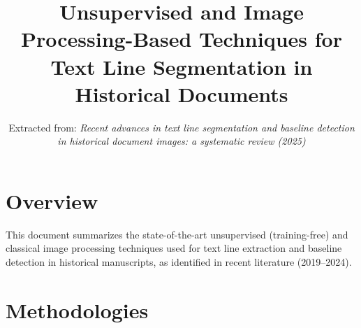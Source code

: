 \documentclass{article}
\title{Unsupervised and Image Processing-Based Techniques for \\ Text Line Segmentation in Historical Documents}
\author{Extracted from: \textit{Recent advances in text line segmentation and baseline detection} \\ \textit{in historical document images: a systematic review (2025)}}
\date{}
\begin{document}
\maketitle

\section*{Overview}
This document summarizes the state-of-the-art unsupervised (training-free) and classical image processing techniques used for text line extraction and baseline detection in historical manuscripts, as identified in recent literature (2019--2024).

\section*{Methodologies}
\end{document}
